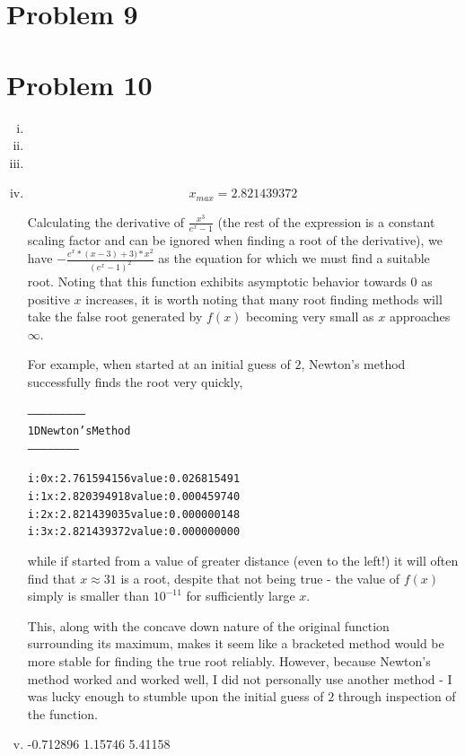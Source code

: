 \documentclass[11pt]{article} %
\begin{document}
\section*{Problem 9}

\section*{Problem 10}
\begin{enumerate}[i.)]
\item
\item
\item
\item
$$x_{max} = 2.821439372$$
\par Calculating the derivative of $\frac{x^3}{e^x-1}$ (the rest of the expression is a constant scaling factor and can be ignored when finding a root of the derivative), we have $-\frac{e^x*(x-3)+3)*x^2}{(e^x-1)^2}$ as the equation for which we must find a suitable root. Noting that this function exhibits asymptotic behavior towards 0 as positive $x$ increases, it is worth noting that many root finding methods will take the false root generated by $f(x)$ becoming very small as $x$ approaches $\infty$.
\par For example, when started at an initial guess of $2$, Newton's method successfully finds the root very quickly,
\begin{alltt}
--------------------------
 1D Newton's Method
 -----------------------


i: 0	x: 2.761594156	value: 0.026815491
i: 1	x: 2.820394918	value: 0.000459740
i: 2	x: 2.821439035	value: 0.000000148
i: 3	x: 2.821439372	value: 0.000000000
\end{alltt}
while if started from a value of greater distance (even to the left!) it will often find that $x \approx 31$ is a root, despite that not being true - the value of $f(x)$ simply is smaller than $10^{-11}$ for sufficiently large $x$.
\par This, along with the concave down nature of the original function surrounding its maximum, makes it seem like a bracketed method would be more stable for finding the true root reliably. However, because Newton's method worked and worked well, I did not personally use another method - I was lucky enough to stumble upon the initial guess of $2$ through inspection of the function.
\item -0.712896 1.15746 5.41158
\end{enumerate}
\end{document}
